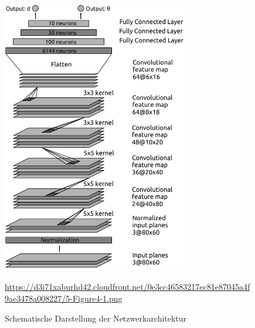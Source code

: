 \begin{figure}[H]
	\centering
	\includegraphics[width=0.75\textwidth]{kapitel4/images/network_architecture.png}
	\caption{Schematische Darstellung der Netzwerkarchitektur}
	\label{network-architecture}
	\vspace{0.2cm}
	\quelle\url{https://d3i71xaburhd42.cloudfront.net/0e3cc46583217ec81e87045a4f9ae3478a008227/5-Figure4-1.png}
\end{figure}




